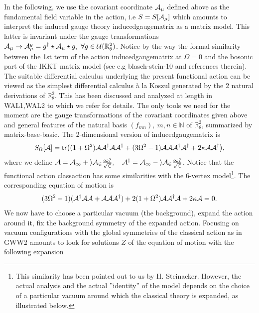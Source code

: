 \documentclass[10pt]{book}
\newcommand{\tr}{\mathsf{tr}}
\theoremstyle{break}
\begin{document}
In the following, we use the covariant coordinate ${\cal{A}}_\mu$  defined above as the fundamental field variable in the action, i.e $S=S[{\cal{A}}_\mu]$ which amounts to interpret the induced gauge theory {inducedgaugematrix} as a matrix model. This latter is invariant under the gauge transformations ${\cal{A}}_\mu\rightarrow{\cal{A}}_\mu^g=g^\dag\star{\cal{A}}_\mu\star g,\ \forall g\in{\cal{U}}(\mathbb{R}^2_\theta)$. Notice by the way the formal similarity between the 1st term of the action {inducedgaugematrix} at $\Omega=0$ and the bosonic part of the IKKT matrix model (see e.g {blasch-stein-10} and references therein). The suitable differential calculus underlying the present functional action can be viewed as the simplest differential calculus \`a la Koszul generated by the 2 natural derivations of $\mathbb{R}^2_\theta$. This has been discussed and analyzed at length in {WAL1,WAL2} to which we refer for details. The only tools we need for the moment are the gauge transformations 
of the covariant coordinates given above and general features of the natural basis $(f_{mn}),\ m,n\in\mathbb{N}$ of $\mathbb{R}^2_\theta$, summarized by matrix-base-basic. The 2-dimensional version of inducedgaugematrix is
\begin{equation*}
S_\Omega[\mathcal{A}]=\tr\big((1+\Omega^2){\cal{A}}{\cal{A}^\dag}{\cal{A}}{\cal{A}}^\dag+(3\Omega^2-1){\cal{A}}{\cal{A}}{\cal{A}}^\dag{\cal{A}}^\dag+
2\kappa{\cal{A}}
{\cal{A}}^\dag\big),
\end{equation*}
where we define $\cal{A}=\cal{A}_1+i\cal{A}_2\frac{1?}{\sqrt{2}},\quad {{\cal{A}}}^\dag={{{\cal{A}}_1-i{\cal{A}}_2}\frac{1?}{\sqrt{2}}}$.
Notice that the functional action {classaction} has some similarities with the 6-vertex model\footnote{This similarity has been pointed out to us by H. Steinacker. However, the actual analysis and the actual ''identity'' of the model depends on the choice of a particular vacuum around which the classical theory is expanded, as illustrated below.}. The corresponding equation of motion is 
\begin{equation*}
(3\Omega^2-1)({\cal{A}}^\dag{\cal{A}}{\cal{A}}+{\cal{A}}{\cal{A}}{\cal{A}}^\dag)+2(1+\Omega^2){\cal{A}}{\cal{A}}^\dag{\cal{A}}+2\kappa{\cal{A}}=0.
\end{equation*}
We now have to choose a particular vacuum (the background), expand the action around it, fix the background symmetry of the expanded action. Focusing on vacuum configurations with the global symmetries of the classical action as in {GWW2} amounts to look for solutions $Z$ of the equation of motion with the following expansion
\end{document}
